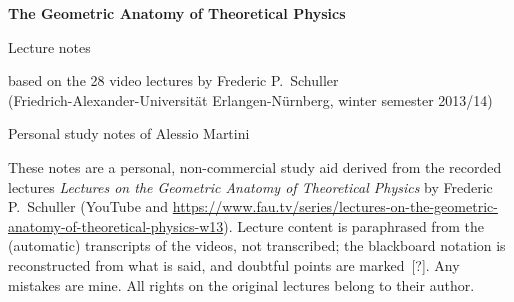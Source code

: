 \documentclass[12pt,oneside,openany]{book}
\begin{document}
\frontmatter
\begin{titlepage}
  \centering
  \vspace*{3cm}
  {\Huge\bfseries The Geometric Anatomy of Theoretical Physics\par}
  \vspace{1cm}
  {\Large Lecture notes\par}
  \vspace{0.5cm}
  {\large based on the 28 video lectures by Frederic P.~Schuller\\
  (Friedrich-Alexander-Universit\"at Erlangen-N\"urnberg, winter semester 2013/14)\par}
  \vspace{2cm}
  {\large Personal study notes of Alessio Martini\par}
  \vfill
  \begin{minipage}{0.85\textwidth}\small
    These notes are a personal, non-commercial study aid derived from the recorded lectures
    \emph{Lectures on the Geometric Anatomy of Theoretical Physics} by Frederic P.~Schuller
    (YouTube and \url{https://www.fau.tv/series/lectures-on-the-geometric-anatomy-of-theoretical-physics-w13}).
    Lecture content is paraphrased from the (automatic) transcripts of the videos, not transcribed;
    the blackboard notation is reconstructed from what is said, and doubtful points are marked~[?].
    Any mistakes are mine. All rights on the original lectures belong to their author.
  \end{minipage}
  \vspace{1cm}
\end{titlepage}
\end{document}

